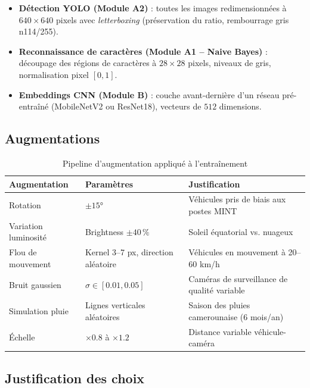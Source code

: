 \documentclass[12pt,a4paper]{article}
\begin{document}
\begin{itemize}
  \item \textbf{D\'{e}tection YOLO (Module A2)} : toutes les images
        redimensionn\'{e}es \`{a} $640 \times 640$ pixels avec \textit{letterboxing}
        (pr\'{e}servation du ratio, rembourrage gris n\textordmasculine{}114/255).
  \item \textbf{Reconnaissance de caract\`{e}res (Module A1 -- Naive Bayes)} :
        d\'{e}coupage des r\'{e}gions de caract\`{e}res \`{a} $28 \times 28$
        pixels, niveaux de gris, normalisation pixel $[0,1]$.
  \item \textbf{Embeddings CNN (Module B)} : couche avant-derni\`{e}re d'un
        r\'{e}seau pr\'{e}-entra\^{i}n\'{e} (MobileNetV2 ou ResNet18),
        vecteurs de $512$ dimensions.
\end{itemize}

\subsection{Augmentations}

\begin{table}[H]
\centering
\caption{Pipeline d'augmentation appliqu\'{e} \`{a} l'entra\^{i}nement}
\label{tab:dsd:augmentation}
\begin{tabular}{p{4cm}p{4cm}p{5cm}}
\toprule
\textbf{Augmentation} & \textbf{Param\`{e}tres} & \textbf{Justification} \\
\midrule
Rotation
  & $\pm 15°$
  & V\'{e}hicules pris de biais aux postes MINT \\
Variation luminosit\'{e}
  & Brightness $\pm 40\,\%$
  & Soleil \'{e}quatorial vs. nuageux \\
Flou de mouvement
  & Kernel 3--7 px, direction al\'{e}atoire
  & V\'{e}hicules en mouvement \`{a} 20--60 km/h \\
Bruit gaussien
  & $\sigma \in [0.01, 0.05]$
  & Cam\'{e}ras de surveillance de qualit\'{e} variable \\
Simulation pluie
  & Lignes verticales al\'{e}atoires
  & Saison des pluies camerounaise (6 mois/an) \\
\'{E}chelle
  & $\times 0.8$ \`{a} $\times 1.2$
  & Distance variable v\'{e}hicule-cam\'{e}ra \\
\bottomrule
\end{tabular}
\end{table}

\subsection{Justification des choix}
\end{document}
